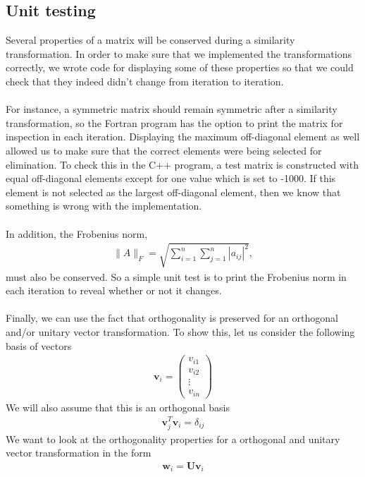 \documentclass{article}
\begin{document}
\subsection{Unit testing} \label{section:unit}
Several properties of a matrix will be conserved during a similarity transformation. In order to make sure that we implemented the transformations correctly, we wrote code for displaying some of these properties so that we could check that they indeed didn't change from iteration to iteration.\\\\
For instance, a symmetric matrix should remain symmetric after a similarity transformation, so the Fortran program has the option to print the matrix for inspection in each iteration. Displaying the maximum off-diagonal element as well allowed us to make sure that the correct elements were being selected for elimination. To check this in the C++ program, a test matrix is constructed with equal off-diagonal elements except for one value which is set to -1000. If this element is not selected as the largest off-diagonal element, then we know that something is wrong with the implementation. \\\\
In addition, the Frobenius norm,
\begin{align*}
	\lVert A\rVert_F = \sqrt{\sum_{i=1}^n\sum_{j=1}^n|a_{ij}|^2},
\end{align*}
must also be conserved. So a simple unit test is to print the Frobenius norm in each iteration to reveal whether or not it changes.\\\\
Finally, we can use the fact that orthogonality is preserved for an orthogonal and/or unitary vector transformation. To show this, let us consider the following basis of vectors
\begin{align}
\mathbf{v}_i = \begin{pmatrix}
v_{i1} \\
v_{i2} \\
\vdots \\
v_{in}
\end{pmatrix}
\end{align}
We will also assume that this is an orthogonal basis
\begin{align}
\mathbf{v}_j^T\mathbf{v}_i = \delta_{ij}
\end{align}
We want to look at the orthogonality properties for a orthogonal and unitary vector transformation in the form
\begin{align}
\mathbf{w}_i = \mathbf{U}\mathbf{v}_i
\end{align}
\end{document}
